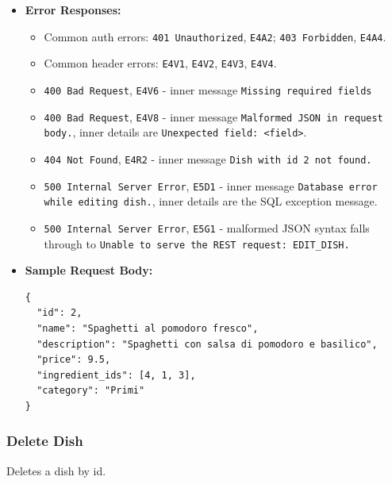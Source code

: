 \begin{itemize}[nosep]
\item \textbf{Error Responses:}

\begin{itemize}[nosep]
\item Common auth errors: \texttt{401 Unauthorized}, \texttt{E4A2}; \texttt{403 Forbidden}, \texttt{E4A4}.
\item Common header errors: \texttt{E4V1}, \texttt{E4V2}, \texttt{E4V3}, \texttt{E4V4}.
\item \texttt{400 Bad Request}, \texttt{E4V6} - inner message \texttt{Missing required fields}
\item \texttt{400 Bad Request}, \texttt{E4V8} - inner message \texttt{Malformed JSON in request body.}, inner details are \texttt{Unexpected field: <field>}.
\item \texttt{404 Not Found}, \texttt{E4R2} - inner message \texttt{Dish with id 2 not found.}
\item \texttt{500 Internal Server Error}, \texttt{E5D1} - inner message \texttt{Database error while editing dish.}, inner details are the SQL exception message.
\item \texttt{500 Internal Server Error}, \texttt{E5G1} - malformed JSON syntax falls through to \texttt{Unable to serve the REST request: EDIT\_DISH.}
\end{itemize}

\item \textbf{Sample Request Body:}

\begin{lstlisting}
{
  "id": 2,
  "name": "Spaghetti al pomodoro fresco",
  "description": "Spaghetti con salsa di pomodoro e basilico",
  "price": 9.5,
  "ingredient_ids": [4, 1, 3],
  "category": "Primi"
}
\end{lstlisting}
\end{itemize}

\subsubsection*{Delete Dish}

Deletes a dish by id.

